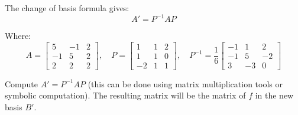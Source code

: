 \documentclass[12pt]{article}
\begin{document}
\begin{answerbox}
\begin{enumerate}
  The change of basis formula gives:
  $$
  A' = P^{-1} A P
  $$

  Where:
  $$
  A = \begin{bmatrix}
  5 & -1 & 2 \\
  -1 & 5 & 2 \\
  2 & 2 & 2
  \end{bmatrix}, \quad
  P = \begin{bmatrix}
  1 & 1 & 2 \\
  1 & 1 & 0 \\
  -2 & 1 & 1
  \end{bmatrix}, \quad
  P^{-1} = \frac{1}{6}
  \begin{bmatrix}
  -1 & 1 & 2 \\
  -1 & 5 & -2 \\
  3 & -3 & 0
  \end{bmatrix}
  $$

  Compute $ A' = P^{-1} A P $ (this can be done using matrix multiplication tools or symbolic computation). The resulting matrix will be the matrix of $ f $ in the new basis $ B' $.
\end{enumerate}
\end{answerbox}

\end{document}
